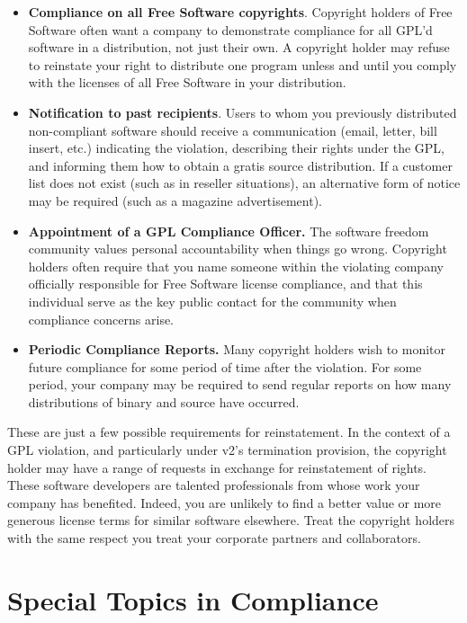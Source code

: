 \begin{itemize}

\item {\bf Compliance on all Free Software copyrights}.  Copyright holders of Free Software
  often want a company to demonstrate compliance for all GPL'd software in
  a distribution, not just their own.  A copyright holder may refuse to
  reinstate your right to distribute one program unless and until you
  comply with the licenses of all Free Software in your distribution.
 
\item {\bf Notification to past recipients}.  Users to whom you previously
  distributed non-compliant software should receive a communication
  (email, letter, bill insert, etc.) indicating the violation, describing
  their rights under the GPL, and informing them how to obtain a gratis source
  distribution.  If a customer list does not exist (such as in reseller
  situations), an alternative form of notice may be required (such as a
  magazine advertisement).

\item {\bf Appointment of a GPL Compliance Officer.}  The software freedom community
  values personal accountability when things go wrong.  Copyright holders
  often require that you name someone within the violating company
  officially responsible for Free Software license compliance, and that this
  individual serve as the key public contact for the community when
  compliance concerns arise.

\item {\bf Periodic Compliance Reports.}  Many copyright holders wish to
  monitor future compliance for some period of time after the violation.
  For some period, your company may be required to send regular reports on
  how many distributions of binary and source have occurred.
\end{itemize}

These are just a few possible requirements for reinstatement.  In the
context of a GPL violation, and particularly under v2's termination
provision, the copyright holder may have a range of requests in exchange
for reinstatement of rights.  These software developers are talented
professionals from whose work your company has benefited.  Indeed, you are
unlikely to find a better value or more generous license terms for similar
software elsewhere.  Treat the copyright holders with the same respect you
treat your corporate partners and collaborators.

\chapter{Special Topics in Compliance}

